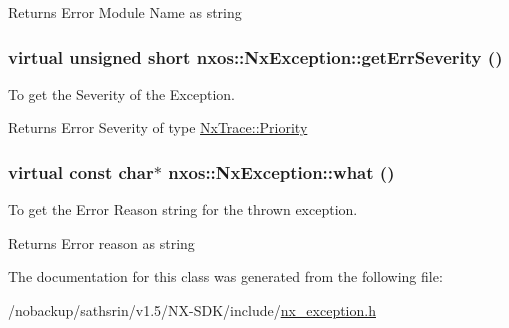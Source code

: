 \begin{DoxyReturn}{Returns}
Error Module Name as string 
\end{DoxyReturn}
\hypertarget{classnxos_1_1NxException_a7b5ffd11c04e3955d874ea7a6b18063f}{
\subsubsection[{getErrSeverity}]{\setlength{\rightskip}{0pt plus 5cm}virtual unsigned short nxos::NxException::getErrSeverity ()}}
\label{classnxos_1_1NxException_a7b5ffd11c04e3955d874ea7a6b18063f}
To get the Severity of the Exception.

\begin{DoxyReturn}{Returns}
Error Severity of type \hyperlink{classnxos_1_1NxTrace_a582f6e5a22e788c61807657f8bca088f}{NxTrace::Priority} 
\end{DoxyReturn}
\hypertarget{classnxos_1_1NxException_ad475b90fb193848245b9537524439943}{
\subsubsection[{what}]{\setlength{\rightskip}{0pt plus 5cm}virtual const char$\ast$ nxos::NxException::what ()}}
\label{classnxos_1_1NxException_ad475b90fb193848245b9537524439943}
To get the Error Reason string for the thrown exception.

\begin{DoxyReturn}{Returns}
Error reason as string 
\end{DoxyReturn}


The documentation for this class was generated from the following file:\begin{DoxyCompactItemize}
\item 
/nobackup/sathsrin/v1.5/NX-\/SDK/include/\hyperlink{nx__exception_8h}{nx\_\-exception.h}\end{DoxyCompactItemize}
